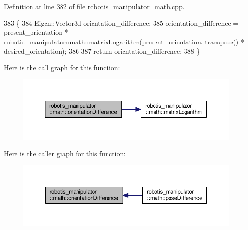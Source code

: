 Definition at line 382 of file robotis\+\_\+manipulator\+\_\+math.\+cpp.


\begin{DoxyCode}
383 \{
384   Eigen::Vector3d orientation\_difference;
385   orientation\_difference = present\_orientation * 
      \hyperlink{namespacerobotis__manipulator_1_1math_a38b3c7716c5b8a29a75d8b3243eb75e7}{robotis\_manipulator::math::matrixLogarithm}(present\_orientation.
      transpose() * desired\_orientation);
386 
387   \textcolor{keywordflow}{return} orientation\_difference;
388 \}
\end{DoxyCode}


Here is the call graph for this function\+:\nopagebreak
\begin{figure}[H]
\begin{center}
\leavevmode
\includegraphics[width=350pt]{namespacerobotis__manipulator_1_1math_a26796dad948a40bc2c0ac2c139ed85f0_cgraph}
\end{center}
\end{figure}




Here is the caller graph for this function\+:\nopagebreak
\begin{figure}[H]
\begin{center}
\leavevmode
\includegraphics[width=350pt]{namespacerobotis__manipulator_1_1math_a26796dad948a40bc2c0ac2c139ed85f0_icgraph}
\end{center}
\end{figure}


